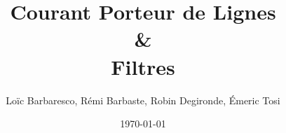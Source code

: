 \documentclass[a4paper,11pt]{report}
\title{Courant Porteur de Lignes \\ \& \\Filtres}
\author{Loïc Barbaresco, Rémi Barbaste, Robin Degironde, Émeric Tosi}
\date{\today}
\begin{document}
    \maketitle{}



    \setcounter{tocdepth}{1} %
    \renewcommand{\contentsname}{Sommaire} %
    \tableofcontents{} %
    \clearpage


    
    \clearpage

    
    \clearpage

    \listoffigures
    \clearpage
\end{document}
